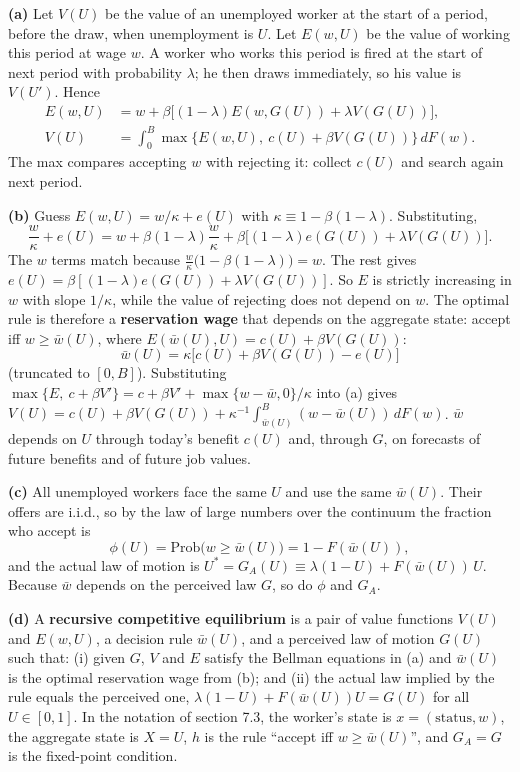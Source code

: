 \documentclass[12pt, letterpaper]{article}
\begin{document}
\begin{tcolorbox}[oddbox,title={Exercise 7.7 \quad Equilibrium search}]
\textbf{(a)} Let $V(U)$ be the value of an unemployed worker at the start of a period, before the
draw, when unemployment is $U$. Let $E(w,U)$ be the value of working this period at wage $w$. A
worker who works this period is fired at the start of next period with probability $\lambda$; he
then draws immediately, so his value is $V(U')$. Hence
\begin{align*}
E(w,U)&=w+\beta\big[(1-\lambda)E(w,G(U))+\lambda V(G(U))\big],\\
\boxed{V(U)}&\boxed{{}=\int_0^B\max\Big\{E(w,U),\ c(U)+\beta V(G(U))\Big\}\,dF(w).}
\end{align*}
The max compares accepting $w$ with rejecting it: collect $c(U)$ and search again next period.

\textbf{(b)} Guess $E(w,U)=w/\kappa+e(U)$ with $\kappa\equiv1-\beta(1-\lambda)$. Substituting,
\[
\frac w\kappa+e(U)=w+\beta(1-\lambda)\frac w\kappa+\beta\big[(1-\lambda)e(G(U))+\lambda V(G(U))\big].
\]
The $w$ terms match because $\frac{w}{\kappa}\big(1-\beta(1-\lambda)\big)=w$. The rest gives
$e(U)=\beta[(1-\lambda)e(G(U))+\lambda V(G(U))]$. So $E$ is strictly increasing in $w$ with slope
$1/\kappa$, while the value of rejecting does not depend on $w$. The optimal rule is therefore a
\textbf{reservation wage} that depends on the aggregate state: accept iff $w\ge\bar w(U)$, where
$E(\bar w(U),U)=c(U)+\beta V(G(U))$:
\[
\boxed{\bar w(U)=\kappa\big[c(U)+\beta V(G(U))-e(U)\big]}
\]
(truncated to $[0,B]$). Substituting $\max\{E,\ c+\beta V'\}=c+\beta V'+\max\{w-\bar w,0\}/\kappa$
into (a) gives
$V(U)=c(U)+\beta V(G(U))+\kappa^{-1}\int_{\bar w(U)}^B(w-\bar w(U))\,dF(w)$. $\bar w$ depends on
$U$ through today's benefit $c(U)$ and, through $G$, on forecasts of future benefits and of future
job values.

\textbf{(c)} All unemployed workers face the same $U$ and use the same $\bar w(U)$. Their offers are
i.i.d., so by the law of large numbers over the continuum the fraction who accept is
\[
\boxed{\phi(U)=\text{Prob}\big(w\ge\bar w(U)\big)=1-F(\bar w(U)),}
\]
and the actual law of motion is
$U^*=G_A(U)\equiv\lambda(1-U)+F(\bar w(U))\,U$. Because $\bar w$ depends on the perceived law $G$,
so do $\phi$ and $G_A$.

\textbf{(d)} A \textbf{recursive competitive equilibrium} is a pair of value functions $V(U)$ and
$E(w,U)$, a decision rule $\bar w(U)$, and a perceived law of motion $G(U)$ such that:
(i) given $G$, $V$ and $E$ satisfy the Bellman equations in (a) and $\bar w(U)$ is the optimal
reservation wage from (b); and (ii) the actual law implied by the rule equals the perceived one,
$\lambda(1-U)+F(\bar w(U))U=G(U)$ for all $U\in[0,1]$. In the notation of section 7.3, the worker's
state is $x=(\text{status},w)$, the aggregate state is $X=U$, $h$ is the rule ``accept iff
$w\ge\bar w(U)$'', and $G_A=G$ is the fixed-point condition.


\end{tcolorbox}
\end{document}
